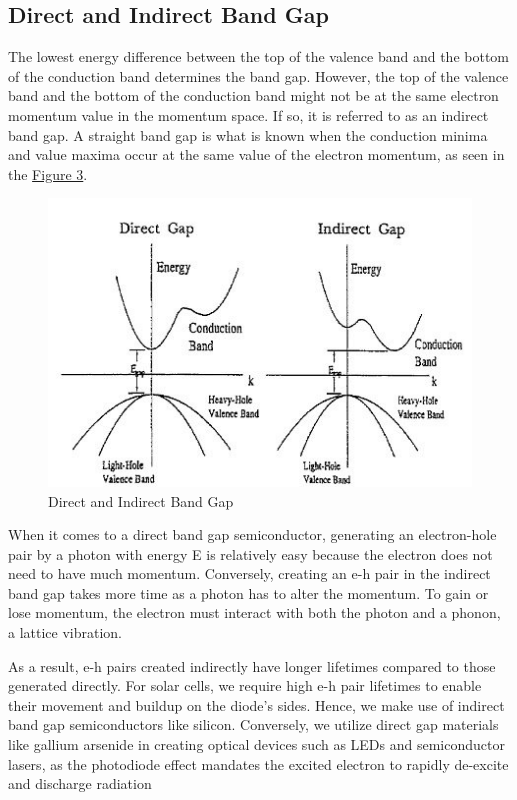 	\subsection{Direct and Indirect Band Gap}

		The lowest energy difference between the top of the valence band and the bottom of the conduction band determines the band gap. However, the top of the valence band and the bottom of the conduction band might not be at the same electron momentum value in the momentum space. If so, it is referred to as an indirect band gap. A straight band gap is what is known when the conduction minima and value maxima occur at the same value of the electron momentum, as seen in the \hyperref[fig:3]{Figure 3}.

		\begin{figure}[h]
			\centering
			\includegraphics[width=0.8\columnwidth]{images/theory3.jpeg}
			\caption{Direct and Indirect Band Gap}
			\label{fig:3}
		\end{figure}

		When it comes to a direct band gap semiconductor, generating an electron-hole pair by a photon with energy E is relatively easy because the electron does not need to have much momentum. Conversely, creating an e-h pair in the indirect band gap takes more time as a photon has to alter the momentum. To gain or lose momentum, the electron must interact with both the photon and a phonon, a lattice vibration.
		
		As a result, e-h pairs created indirectly have longer lifetimes compared to those generated directly. For solar cells, we require high e-h pair lifetimes to enable their movement and buildup on the diode's sides. Hence, we make use of indirect band gap semiconductors like silicon. Conversely, we utilize direct gap materials like gallium arsenide in creating optical devices such as LEDs and semiconductor lasers, as the photodiode effect mandates the excited electron to rapidly de-excite and discharge radiation

